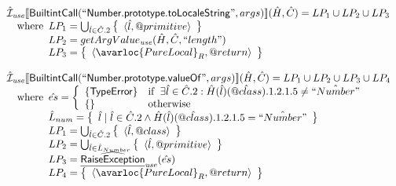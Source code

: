 \[\begin{array}{l}
\aI_{\it use}\lbr \SF{BuiltintCall}(``\SF{Number.prototype.toLocaleString}",args)\rbr(\hat{H},\hat{C}) = LP_1 \cup LP_2 \cup LP_3\\
\quad\wherec{
  LP_1 = \bigcup_{\hat{l} \in \hat{C}.2} \set{\langle \hat{l},\varprop{primitive} \rangle}\\
  LP_2 = getArgValue_{\it use}(\hat{H}, \hat{C}, ``length")\\
  LP_3 = \set{\langle\avarloc{PureLocal}_R,\varprop{return}\rangle}\\
  }\\
\\


\aI_{\it use}\lbr \SF{BuiltintCall}(``\SF{Number.prototype.valueOf}",args)\rbr(\hat{H},\hat{C}) = LP_1 \cup LP_2 \cup LP_3 \cup LP_4\\
\quad\wherec{
  \hat{es} = \left\{\begin{array}{ll}
      \{ \SF{TypeError} \}
      & \ifc{\exists\hat{l}\in\hat{C}.2: \hat{H}(\hat{l})(\avarprop{class}).1.2.1.5 \neq \hat{``Number"}}\\
      \set{} & \owc
    \end{array}\right.\\
  \hat{L}_{num} = \set{\hat{l} \mid \hat{l} \in \hat{C}.2 \land \hat{H}(\hat{l})(\avarprop{class}).1.2.1.5 = \hat{``Number"}}\\
  LP_1 = \bigcup_{\hat{l} \in \hat{C}.2} \set{\langle \hat{l},\varprop{class} \rangle}\\
  LP_2 = \bigcup_{\hat{l} \in \hat{L}_{Number}} \set{\langle \hat{l},\varprop{primitive} \rangle}\\
  LP_3 = \ahf{RaiseException}_{\it use}(\hat{es})\\
  LP_4 = \set{\langle\avarloc{PureLocal}_R,\varprop{return}\rangle}\\
  }\\
\\



\end{array}\]
